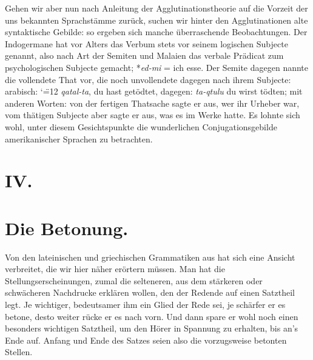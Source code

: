 \label{sp.373}

Gehen wir aber nun nach Anleitung der Agglutinationstheorie auf die Vorzeit der uns bekannten Sprachstämme zurück, suchen wir hinter den Agglutinationen alte syntaktische Gebilde: so ergeben sich manche überraschende Beobachtungen. Der Indogermane hat vor Alters das Verbum stets vor seinem logischen Subjecte genannt, also nach Art der Semiten und Malaien das verbale Prädicat zum psychologischen Subjecte gemacht; *\textit{ed-mi} = ich esse. Der Semite dagegen nannte die vollendete That vor, die noch unvollendete dagegen nach ihrem Subjecte: arabisch: 
{\catcode`\"=12%
}
\textit{qatal-ta}, du hast getödtet, dagegen:  \textit{ta-qtulu} du wirst tödten; mit anderen Worten: von der fertigen Thatsache sagte er aus, \label{fp.357} wer ihr Urheber war, vom thätigen Subjecte aber sagte er aus, was es im Werke hatte.  Es lohnte sich wohl, unter diesem Gesichtspunkte die wunderlichen Conjugationsgebilde amerikanischer Sprachen zu betrachten.

\section*{IV.}\label{IV.III.IV}
\section*{Die Betonung.}

Von den lateinischen und griechischen Grammatiken aus hat sich  eine Ansicht verbreitet, die wir hier näher erörtern müssen. Man hat die Stellungserscheinungen, zumal die selteneren, aus dem stärkeren oder schwächeren Nachdrucke erklären wollen, den der Redende auf einen Satztheil legt. Je wichtiger, bedeutsamer ihm ein Glied der Rede sei, je schärfer er es betone, desto weiter rücke er es nach vorn. Und dann spare er wohl noch einen besonders wichtigen Satztheil, um den Hörer in Spannung zu erhalten, bis an’s Ende auf. Anfang und Ende des Satzes seien also die vorzugsweise betonten Stellen.

